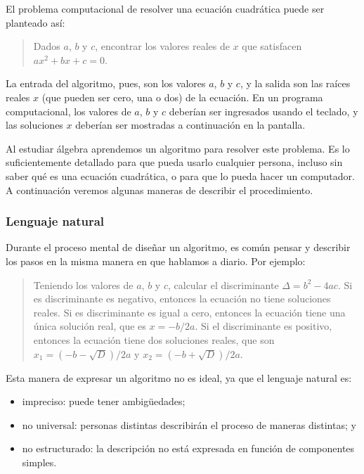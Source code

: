 El problema computacional de resolver una ecuación cuadrática puede ser
planteado así:

\begin{quote}
Dados \(a\), \(b\) y \(c\), encontrar los valores reales de \(x\) que satisfacen
\(ax^2 + bx + c = 0\).
\end{quote}

La entrada del algoritmo, pues, son los valores \(a\), \(b\) y \(c\), y la
salida son las raíces reales \(x\) (que pueden ser cero, una o dos) de la
ecuación. En un programa computacional, los valores de \(a\), \(b\) y \(c\)
deberían ser ingresados usando el teclado, y las soluciones \(x\) deberían
ser mostradas a continuación en la pantalla.

Al estudiar álgebra aprendemos un algoritmo para resolver este problema.
Es lo suficientemente detallado para que pueda usarlo cualquier persona,
incluso sin saber qué es una ecuación cuadrática, o para que lo pueda
hacer un computador. A continuación veremos algunas maneras de describir
el procedimiento.

\subsubsection{Lenguaje natural}

Durante el proceso mental de diseñar un algoritmo, es común pensar y
describir los pasos en la misma manera en que hablamos a diario. Por
ejemplo:

\begin{quote}
Teniendo los valores de \(a\), \(b\) y \(c\), calcular el discriminante
\(\Delta = b^2 - 4ac\). Si es discriminante es negativo, entonces la ecuación no
tiene soluciones reales. Si es discriminante es igual a cero, entonces
la ecuación tiene una única solución real, que es \(x = -b/2a\). Si el
discriminante es positivo, entonces la ecuación tiene dos soluciones
reales, que son \(x_1 = (-b - \sqrt{D})/2a\) y \(x_2 = (-b + \sqrt{D})/2a\).
\end{quote}

Esta manera de expresar un algoritmo no es ideal, ya que el lenguaje
natural es:

\begin{itemize}
\item
  impreciso: puede tener ambigüedades;
\item
  no universal: personas distintas describirán el proceso de maneras
  distintas; y
\item
  no estructurado: la descripción no está expresada en función de
  componentes simples.
\end{itemize}

